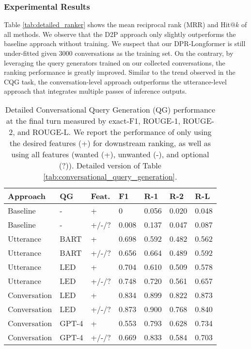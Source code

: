 \subsubsection{Experimental Results}
Table \ref{tab:detailed_ranker} shows the mean reciprocal rank (MRR) and Hit$@k$ of all methods. 
We observe that the D2P approach only slightly outperforms the baseline approach without training. We suspect that our DPR-Longformer is still under-fitted given 3000 conversations as the training set. On the contrary, by leveraging the query generators trained on our collected conversations, the ranking performance is greatly improved. 
Similar to the trend observed in the CQG task, the conversation-level approach outperforms the utterance-level approach that integrates multiple passes of inference outputs. 


\begin{table}[t]  \small
\centering
\setlength{\tabcolsep}{3pt}
\begin{tabular}{lllllll}
\hline
\textbf{Approach} & \textbf{QG} & \textbf{Feat.} & \textbf{F1} & \textbf{R-1} & \textbf{R-2} & \textbf{R-L}\\ \hline
Baseline & - & + & 0 & 0.056 & 0.020 & 0.048 \\ 
Baseline & - & +/-/? & 0.008 & 0.137 & 0.047 & 0.087  \\  \hline \hline
Utterance & BART & + & 0.698 & 0.592 & 0.482 & 0.562 \\ 
Utterance & BART & +/-/? & 0.656 & 0.664 & 0.489 & 0.592 \\  \hline
Utterance & LED & + & 0.704 & 0.610 & 0.509 & 0.578 \\ 
Utterance & LED & +/-/? & 0.748 & 0.720 & 0.561 & 0.657 \\  \hline
Conversation & LED & + & 0.834 & 0.899 & 0.822 & 0.873 \\ 
Conversation & LED & +/-/? & 0.873 & 0.900 & 0.768 & 0.840 \\  \hline \hline
Conversation & GPT-4 & + & 0.553 & 0.793 & 0.628 & 0.734 \\  
Conversation & GPT-4 & +/-/? & 0.669 & 0.833 & 0.584 & 0.703 \\ \hline
\end{tabular}

\caption{Detailed Conversational Query Generation (QG) performance at the final turn measured by exact-F1, ROUGE-1, ROUGE-2, and ROUGE-L. We report the performance of only using the desired features (+) for downstream ranking, as well as using all features (wanted (+), unwanted (-), and optional (?)). Detailed version of Table \ref{tab:conversational_query_generation}.}
\label{tab:detailed_conversational_query_generation}
\end{table}

